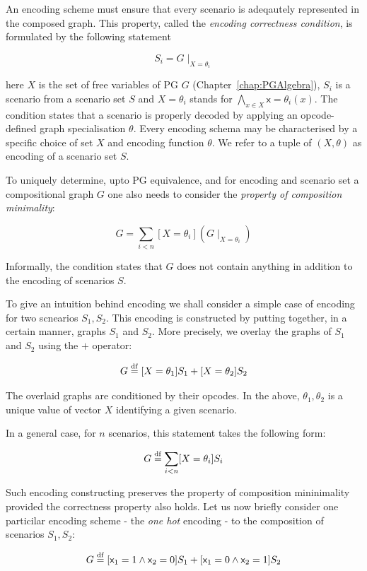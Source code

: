 An encoding scheme must ensure that every scenario is adeqautely represented in the composed graph. This property, called the \emph{encoding correctness condition}, is formulated by the following statement

$$
S_i = G \mid_{X = \theta_i} 
$$

\noindent
here $X$ is the set of free variables of PG $G$ (Chapter~\ref{chap:PGAlgebra}), $S_i$ is a scenario from a scenario set $S$ and $X = \theta_i$ stands for $\bigwedge_{x \in X} \mathsf{x} = \theta_i(x)$. The condition states that a scenario is properly decoded by applying an opcode-defined graph specialisation $\theta$. Every encoding schema may be characterised by a specific choice of set $X$ and encoding function $\theta$. We refer to a tuple of $(X, \theta)$ as encoding of a scenario set $S$.


To uniquely determine, upto PG equivalence, and for encoding and scenario set a compositional graph $G$ one also needs to consider the \emph{property of composition minimality}: 

$$
G = \sum_{i < n} [X = \theta_i](G \mid_{X = \theta_i}) 
$$

\noindent
Informally, the condition states that $G$ does not contain anything in addition to the encoding of scenarios $S$.

To give an intuition behind encoding we shall consider a simple case of encoding for two scnearios $S_1, S_2$. This encoding is constructed by putting together, in a certain manner, graphs $S_1$ and $S_2$. More precisely, we overlay the graphs of $S_1$ and $S_2$ using the $+$ operator: 

$$
G \stackrel{\mathrm{df}}{=} [X = \theta_1]S_1 + [X = \theta_2]S_2
$$

\noindent
The overlaid graphs are conditioned by their opcodes. In the above, $\theta_1, \theta_2$ is a unique value of vector $X$ identifying a given scenario. 

In a general case, for $n$ scenarios, this statement takes the following form:

$$
G \stackrel{\mathrm{df}}{=} \sum_{i < n} [X = \theta_i]S_i 
$$

\noindent
Such encoding constructing preserves the property of composition mininimality provided the correctness property also holds. Let us now briefly consider one particilar encoding scheme - the \emph{one hot} encoding - to the composition of scenarios $S_1, S_2$: 

$$
G \stackrel{\mathrm{df}}{=} [\mathsf{x}_1 = 1 \wedge \mathsf{x}_2 = 0]S_1 + [\mathsf{x}_1 = 0 \wedge \mathsf{x}_2 = 1]S_2
$$

